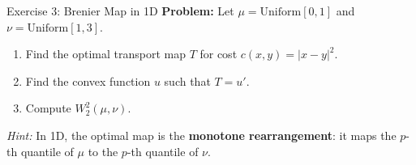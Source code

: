 \documentclass[aspectratio=169]{beamer}
\begin{document}
\begin{frame}{Exercise 3: Brenier Map in 1D}
\textbf{Problem:} Let $\mu = \text{Uniform}[0,1]$ and $\nu = \text{Uniform}[1,3]$.

\vspace{0.3cm}
\begin{enumerate}
    \item[(a)] Find the optimal transport map $T$ for cost $c(x,y) = |x-y|^2$.
    \item[(b)] Find the convex function $u$ such that $T = u'$.
    \item[(c)] Compute $W_2^2(\mu,\nu)$.
\end{enumerate}

\vspace{0.5cm}
\textit{Hint:} In 1D, the optimal map is the \textbf{monotone rearrangement}: it maps the $p$-th quantile of $\mu$ to the $p$-th quantile of $\nu$.
\end{frame}
\end{document}
